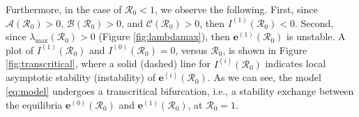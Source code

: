 \documentclass[11pt,reqno]{amsart}
\newcommand{\cR}{\mathcal{R}}
\begin{document}
Furthermore, in the case of $\cR_0<1$, we observe the following. First, since $\mathcal{A}\left(\cR_0\right)>0$, $\mathcal{B}\left(\cR_0\right)>0$, and $\mathcal{C}\left(\cR_0\right)>0$, then $I^{(1)}\left(\cR_0\right)<0$. Second, since $\lambda_{\max}\left(\cR_0\right)>0$ (Figure \ref{fig:lambdamax}), then $\mathbf{e}^{(1)}\left(\cR_0\right)$ is unstable. A plot of $I^{(1)}\left(\cR_0\right)$ and $I^{(0)}\left(\cR_0\right)=0$, versus $\cR_0$, is shown in Figure \ref{fig:transcritical}, where a solid (dashed) line for $I^{(i)}\left(\cR_0\right)$ indicates local asymptotic stability (instability) of $\mathbf{e}^{(i)}\left(\cR_0\right)$. As we can see, the model \eqref{eq:model} undergoes a transcritical bifurcation, i.e., a stability exchange between the equilibria $\mathbf{e}^{(0)}\left(\cR_0\right)$ and $\mathbf{e}^{(1)}\left(\cR_0\right)$, at $\cR_0=1$.
\end{document}
